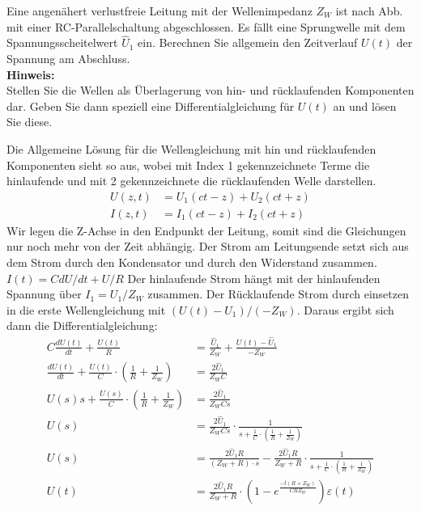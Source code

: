 \begin{question}[section=5,subsection=53,name={Sprungwelle},difficulty=8,type=bsp,mode=skp,tags={20161207}]
	Eine angenähert verlustfreie Leitung mit der Wellenimpedanz $Z_W$ ist nach Abb. mit einer RC-Parallelschaltung abgeschlossen. Es fällt eine Sprungwelle mit dem Spannungsscheitelwert $ \hat U_1$ ein. Berechnen Sie allgemein den Zeitverlauf $ U(t)$ der Spannung am Abschluss.	
	\\ \textbf{Hinweis:}\\
	Stellen Sie die Wellen als Überlagerung von hin- und rücklaufenden Komponenten dar. Geben Sie dann speziell eine Differentialgleichung für $U(t)$ an und lösen Sie diese.
\end{question}
\begin{solution}
	Die Allgemeine Lösung für die Wellengleichung mit hin und rücklaufenden Komponenten sieht so aus, wobei mit Index 1 gekennzeichnete Terme die hinlaufende und mit 2 gekennzeichnete die rücklaufenden Welle darstellen.
	\begin{align}
		U(z,t)&=U_1 (ct -z) + U_2(ct +z)\\
		I(z,t) &= I_1 (ct -z) + I_2(ct +z)
	\end{align}
	Wir legen die Z-Achse in den Endpunkt der Leitung, somit sind die Gleichungen nur noch mehr von der Zeit abhängig. Der Strom am Leitungsende setzt sich aus dem Strom durch den Kondensator und durch den Widerstand zusammen. $I(t) = C dU/dt + U/R$ Der hinlaufende Strom hängt mit der hinlaufenden Spannung über $I_1 = U_1/Z_W$ zusammen. Der Rücklaufende Strom durch einsetzen in die erste Wellengleichung mit $(U(t) - U_1)/(-Z_W)$. Daraus ergibt sich dann die Differentialgleichung:
	\begin{align}
		C \frac{dU(t)}{dt} + \frac{U(t)}{R} &= \frac{\hat U_1}{Z_W} + \frac{U(t) - \hat U_1}{-Z_W}\\
		\frac{dU(t)}{dt} + \frac{U(t)}{C} \cdot \left ( \frac{1}{R} + \frac{1}{Z_W} \right )&= \frac{2 \hat U_1}{Z_W C}\\
		U(s)s + \frac{U(s)}{C} \cdot \left ( \frac{1}{R} + \frac{1}{Z_W} \right )&= \frac{2 \hat U_1}{Z_W C s}\\
		U(s) &= \frac{2 \hat U_1}{Z_W C s} \cdot \frac{1}{s+\frac{1}{C} \cdot \left ( \frac{1}{R} + \frac{1}{Z_W} \right )}\\
		U(s) &= \frac{2 \hat U_1 R}{(Z_W + R)\cdot s} - \frac{2 \hat U_1 R}{Z_W + R} \cdot \frac{1}{s+\frac{1}{C} \cdot \left ( \frac{1}{R} + \frac{1}{Z_W} \right )}\\
		U(t) &= \frac{2 \hat U_1 R}{Z_W + R} \cdot \left ( 1 - e^{\frac{-t(R +Z_W)}{C R Z_W}}\right )\varepsilon(t)
	\end{align}
\end{solution}